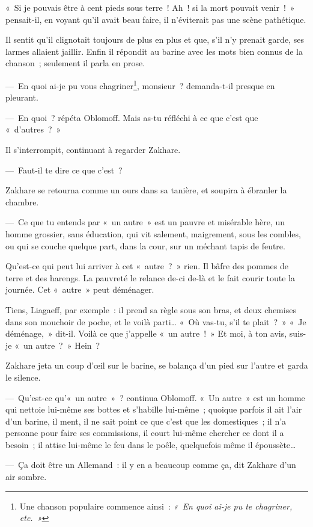 \documentclass[french,twoside]{book} %
\begin{document}
« Si je pouvais être à cent pieds sous terre ! Ah ! si la mort pouvait venir ! » pensait-il, en voyant qu’il avait beau faire, il n’éviterait pas une scène pathétique.\par
Il sentit qu’il clignotait toujours de plus en plus et que, s’il n’y prenait garde, ses larmes allaient jaillir. Enfin il répondit au barine avec les mots bien connus de la chanson ; seulement il parla en prose.\par
— En quoi ai-je pu vous chagriner\footnote{Une chanson populaire commence ainsi : \emph{« En quoi ai-je pu te chagriner, etc. »}}, monsieur ? demanda-t-il presque en pleurant.\par
— En quoi ? répéta Oblomoff. Mais as-tu réfléchi à ce que c’est que « d’autres ? »\par
Il s’interrompit, continuant à regarder Zakhare.\par
— Faut-il te dire ce que c’est ?\par
Zakhare se retourna comme un ours dans sa tanière, et soupira à ébranler la chambre.\par
— Ce que tu entends par « un autre » est un pauvre et misérable hère, un homme grossier, sans éducation, qui vit salement, maigrement, sous les combles, ou qui se couche quelque part, dans la cour, sur un méchant tapis de feutre.\par
Qu’est-ce qui peut lui arriver à cet « autre ? » rien. Il bâfre des pommes de terre et des harengs. La pauvreté le relance de-ci de-là et le fait courir toute la journée. Cet « autre » peut déménager.\par
Tiens, Liagaeff, par exemple : il prend sa règle sous son bras, et deux chemises dans son mouchoir de poche, et le voilà parti… « Où vas-tu, s’il te plait ? » « Je déménage, » dit-il. Voilà ce que j’appelle « un autre ! » Et moi, à ton avis, suis-je « un autre ? » Hein ?\par
Zakhare jeta un coup d’œil sur le barine, se balança d’un pied sur l’autre et garda le silence.\par
— Qu’est-ce qu’« un autre » ? continua Oblomoff. « Un autre » est un homme qui nettoie lui-même ses bottes et s’habille lui-même ; quoique parfois il ait l’air d’un barine, il ment, il ne sait point ce que c’est que les domestiques ; il n’a personne pour faire ses commissions, il court lui-même chercher ce dont il a besoin ; il attise lui-même le feu dans le poêle, quelquefois même il époussète…\par
— Ça doit être un Allemand : il y en a beaucoup comme ça, dit Zakhare d’un air sombre.\par
\end{document}
